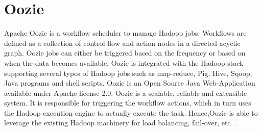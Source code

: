 \section{Oozie}

Apache Oozie is a workflow scheduler to manage Hadoop jobs. Workflows are 
defined as a collection of control flow and action nodes in a directed 
acyclic graph. Oozie jobs can either be triggered based on the frequency 
or based on when the data becomes available. Oozie is integrated with the 
Hadoop stack supporting several types of Hadoop jobs such as map-reduce, Pig,
Hive, Sqoop, Java programs and shell scripts. Oozie is an Open Source Java 
Web-Application available under Apache license 2.0. Oozie is a scalable, 
reliable and extensible system. It is responsible for triggering the workflow 
actions, which in turn uses the Hadoop execution engine to actually execute 
the task. Hence,Oozie is able to leverage the existing Hadoop machinery for
load balancing, fail-over, etc~\cite{hid-sp18-513-oozie}.

